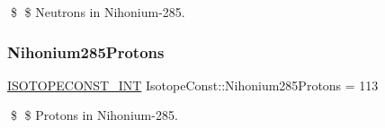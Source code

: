 \$ \$ Neutrons in Nihonium-\/285. \mbox{\label{group___isotope_const-_nihonium-_nh285_gad192e100896ea5188c857c8dd8294a0f}} 
\subsubsection{\texorpdfstring{Nihonium285\+Protons}{Nihonium285Protons}}
{\footnotesize\ttfamily \mbox{\hyperlink{group___isotope_const-_macros_ga5f18360b3e99483a35c32d789e62621c}{I\+S\+O\+T\+O\+P\+E\+C\+O\+N\+S\+T\+\_\+\+I\+NT}} Isotope\+Const\+::\+Nihonium285\+Protons = 113}

\$ \$ Protons in Nihonium-\/285. 